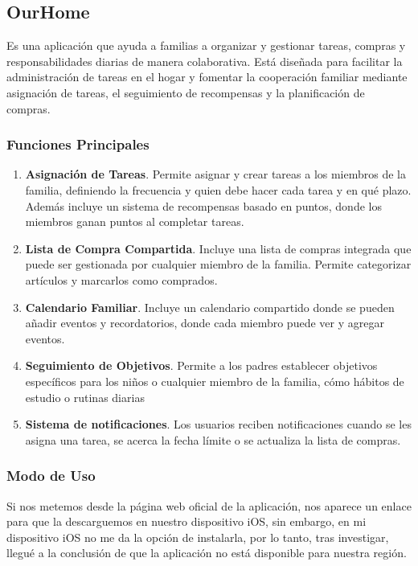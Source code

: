 \clearpage

\subsection{OurHome}
\label{sec:ourhome}
Es una aplicación que ayuda a familias a organizar y gestionar tareas, compras y responsabilidades diarias de manera colaborativa. 
Está diseñada para facilitar la administración de tareas en el hogar y fomentar la cooperación familiar mediante asignación de tareas, 
el seguimiento de recompensas y la planificación de compras. \cite{ourhome2025}

\subsubsection{Funciones Principales}
\label{subsec:funciones_ourhome}

\begin{enumerate}
    \item  \textbf{Asignación de Tareas}. Permite asignar y crear tareas a los miembros de la familia, definiendo la frecuencia y quien debe hacer cada tarea y en qué plazo.
    Además incluye un sistema de recompensas basado en puntos, donde los miembros ganan puntos al completar tareas.
    \item \textbf{Lista de Compra Compartida}. Incluye una lista de compras integrada que puede ser gestionada por cualquier miembro de la familia. Permite categorizar artículos y marcarlos como comprados.
    \item \textbf{Calendario Familiar}. Incluye un calendario compartido donde se pueden añadir eventos y recordatorios, donde cada miembro puede ver y agregar eventos.
    \item \textbf{Seguimiento de Objetivos}. Permite a los padres establecer objetivos específicos para los niños o cualquier miembro de la familia, cómo hábitos de estudio o rutinas diarias 
    \item \textbf{Sistema de notificaciones}. Los usuarios reciben notificaciones cuando se les asigna una tarea, se acerca la fecha límite o se actualiza la lista de compras.
\end{enumerate}

\subsubsection{Modo de Uso}
\label{subsec:uso_ourhome}
Si nos metemos desde la página web oficial de la aplicación, nos aparece un enlace para que la descarguemos en nuestro dispositivo iOS, 
sin embargo, en mi dispositivo iOS no me da la opción de instalarla, por lo tanto, tras investigar, llegué a la conclusión de que la aplicación no 
está disponible para nuestra región.

